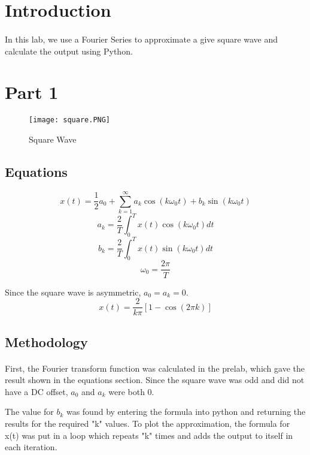\tableofcontents

\newpage
\section{Introduction}

\paragraph{}
In this lab, we use a Fourier Series to approximate a give square wave and calculate the output using Python.

\section{Part 1}

 \begin{figure}[H]
   \centering
   \texttt{[image: square.PNG]}
   \caption{Square Wave}
 \end{figure}

\subsection{Equations}

\[x(t)=\frac{1}{2}a_0+\sum_{k=1}^\infty a_k \cos(k\omega _0 t) +b_k \sin(k\omega_0 t) \]
\[a_k=\frac{2}{T}\int_{0}^{T}x(t)\cos(k\omega_0t)dt\]
\[b_k=\frac{2}{T}\int_{0}^{T}x(t)\sin(k\omega_0t)dt\]
\[\omega_0=\frac{2\pi}{T}\]
\par
Since the square wave is asymmetric, $a_0=a_k=0$.
\[x(t)=\dfrac{2}{k\pi}[1-\cos(2\pi k)]\]

\subsection{Methodology}
\paragraph{}
First, the Fourier transform function was calculated in the prelab, which gave the result shown in the equations section.  Since the square wave was odd and did not have a DC offset, $a_{0}$ and $a_k$ were both 0.
\par 
The value for $b_k$ was found by entering the formula into python and returning the results for the required "k" values.  To plot the approximation, the formula for x(t) was put in a loop which repeats "k" times and adds the output to itself in each iteration.

